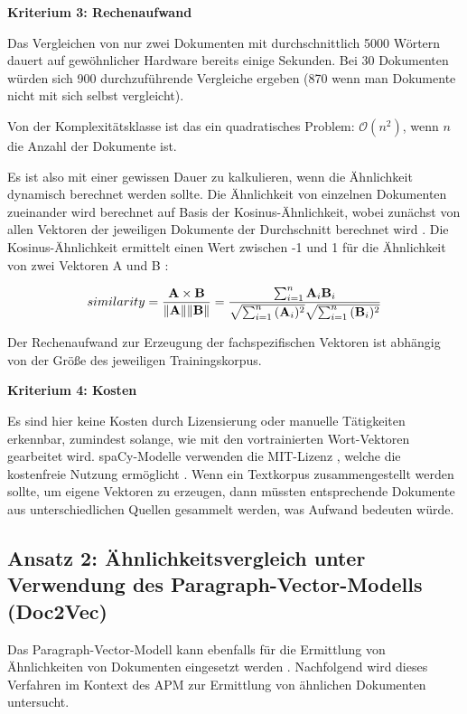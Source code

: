 {\bf Kriterium 3: Rechenaufwand}

Das Vergleichen von nur zwei Dokumenten mit durchschnittlich 5000 Wörtern dauert auf gewöhnlicher Hardware bereits einige Sekunden. Bei 30 Dokumenten würden sich 900 durchzuführende Vergleiche ergeben (870 wenn man Dokumente nicht mit sich selbst vergleicht). 

Von der Komplexitätsklasse ist das ein quadratisches Problem: 
$\mathcal{O}(n^2)$, wenn $n$ die Anzahl der Dokumente ist. 

Es ist also mit einer gewissen Dauer zu kalkulieren, wenn die Ähnlichkeit dynamisch berechnet werden sollte. Die Ähnlichkeit von einzelnen Dokumenten zueinander wird berechnet auf Basis der Kosinus-Ähnlichkeit, wobei zunächst von allen Vektoren der jeweiligen Dokumente der Durchschnitt berechnet wird \cite{spacy3}. Die Kosinus-Ähnlichkeit ermittelt einen Wert zwischen -1 und 1 für die Ähnlichkeit von zwei Vektoren A und B \cite[S. 84]{Gupta}:	
 
 \begin{equation}
similarity = {{\bf A} \times {\bf B} \over \|{\bf A}\| \|{\bf B}\|} = \frac{ \sum_{i=1}^{n}{{\bf A}_i{\bf B}_i} }{ \sqrt{\sum_{i=1}^{n}{({\bf A}_i)^2}} \sqrt{\sum_{i=1}^{n}{({\bf B}_i)^2}} }
\end{equation}

Der Rechenaufwand zur Erzeugung der fachspezifischen Vektoren ist abhängig von der Größe des jeweiligen Trainingskorpus. 

{\bf Kriterium 4: Kosten}

Es sind hier keine Kosten durch Lizensierung oder manuelle Tätigkeiten erkennbar, zumindest solange, wie mit den vortrainierten Wort-Vektoren gearbeitet wird. spaCy-Modelle verwenden die MIT-Lizenz \cite{spacy-license}, welche die kostenfreie Nutzung ermöglicht \cite{MIT}. Wenn ein Textkorpus zusammengestellt werden sollte, um eigene Vektoren zu erzeugen, dann müssten entsprechende Dokumente aus unterschiedlichen Quellen gesammelt werden, was Aufwand bedeuten würde.


\subsection{Ansatz 2: Ähnlichkeitsvergleich unter Verwendung des Paragraph-Vector-Modells (Doc2Vec)}

Das Paragraph-Vector-Modell kann ebenfalls für die Ermittlung von Ähnlichkeiten von Dokumenten eingesetzt werden \cite{Dai}. Nachfolgend wird dieses Verfahren im Kontext des APM zur Ermittlung von ähnlichen Dokumenten untersucht. 

